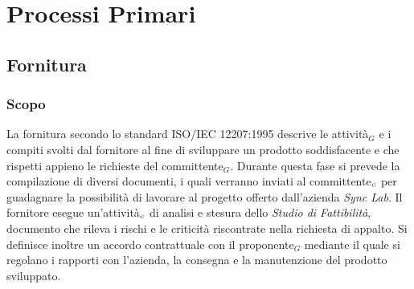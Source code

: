 \chapter{Processi Primari}\label{ProcessiPrimari}
\section{Fornitura}\label{ProcessiPrimariFornitura}
\subsection{Scopo}\label{ProcessiPrimariFornituraScopo}
La fornitura secondo lo standard ISO/IEC 12207:1995 descrive le attività$_G$ e i compiti svolti dal fornitore al fine di sviluppare un prodotto soddisfacente e che rispetti appieno le richieste del committente$_G$.
Durante questa fase si prevede la compilazione di diversi documenti, i quali verranno inviati al committente$_{\scaleto{G}{3pt}}$ per guadagnare la possibilità di lavorare al progetto offerto dall'azienda \textit{Sync Lab}.
Il fornitore esegue un'attività$_{\scaleto{G}{3pt}}$ di analisi e stesura dello \textit{Studio di Fattibilità}, documento che rileva i rischi e le criticità riscontrate nella richiesta di appalto.
Si definisce inoltre un accordo contrattuale con il proponente$_G$ mediante il quale si regolano i rapporti con l'azienda, la consegna e la manutenzione del prodotto sviluppato. 

